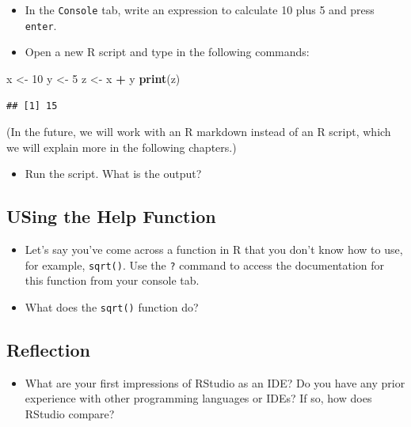 \documentclass[
]{book}
\newenvironment{Shaded}{\begin{snugshade}}{\end{snugshade}}
\newcommand{\DecValTok}[1]{\textcolor[rgb]{0.00,0.00,0.81}{#1}}
\newcommand{\FunctionTok}[1]{\textcolor[rgb]{0.13,0.29,0.53}{\textbf{#1}}}
\newcommand{\NormalTok}[1]{#1}
\newcommand{\OtherTok}[1]{\textcolor[rgb]{0.56,0.35,0.01}{#1}}
\newcommand{\SpecialCharTok}[1]{\textcolor[rgb]{0.81,0.36,0.00}{\textbf{#1}}}
\providecommand{\tightlist}{%
  \setlength{\itemsep}{0pt}\setlength{\parskip}{0pt}}
\begin{document}
\begin{itemize}
\tightlist
\item
  In the \texttt{Console} tab, write an expression to calculate 10 plus 5 and press \texttt{enter}.
\item
  Open a new R script and type in the following commands:
\end{itemize}

\begin{Shaded}
\begin{Highlighting}[]
\NormalTok{x }\OtherTok{\textless{}{-}} \DecValTok{10}
\NormalTok{y }\OtherTok{\textless{}{-}} \DecValTok{5}
\NormalTok{z }\OtherTok{\textless{}{-}}\NormalTok{ x }\SpecialCharTok{+}\NormalTok{ y}
\FunctionTok{print}\NormalTok{(z)}
\end{Highlighting}
\end{Shaded}

\begin{verbatim}
## [1] 15
\end{verbatim}

(In the future, we will work with an R markdown instead of an R script, which we will explain more in the following chapters.)

\begin{itemize}
\tightlist
\item
  Run the script. What is the output?
\end{itemize}

\hypertarget{using-the-help-function}{%
\subsection{USing the Help Function}\label{using-the-help-function}}

\begin{itemize}
\tightlist
\item
  Let's say you've come across a function in R that you don't know how to use, for example, \texttt{sqrt()}. Use the \texttt{?} command to access the documentation for this function from your console tab.
\item
  What does the \texttt{sqrt()} function do?
\end{itemize}

\hypertarget{reflection}{%
\subsection{Reflection}\label{reflection}}

\begin{itemize}
\tightlist
\item
  What are your first impressions of RStudio as an IDE? Do you have any prior experience with other programming languages or IDEs? If so, how does RStudio compare?
\end{itemize}
\end{document}
